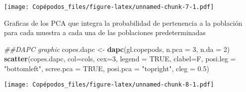 \documentclass[]{article}
\newenvironment{Shaded}{\begin{snugshade}}{\end{snugshade}}
\newcommand{\CommentTok}[1]{\textcolor[rgb]{0.56,0.35,0.01}{\textit{#1}}}
\newcommand{\DataTypeTok}[1]{\textcolor[rgb]{0.13,0.29,0.53}{#1}}
\newcommand{\DecValTok}[1]{\textcolor[rgb]{0.00,0.00,0.81}{#1}}
\newcommand{\FloatTok}[1]{\textcolor[rgb]{0.00,0.00,0.81}{#1}}
\newcommand{\KeywordTok}[1]{\textcolor[rgb]{0.13,0.29,0.53}{\textbf{#1}}}
\newcommand{\NormalTok}[1]{#1}
\newcommand{\OtherTok}[1]{\textcolor[rgb]{0.56,0.35,0.01}{#1}}
\newcommand{\StringTok}[1]{\textcolor[rgb]{0.31,0.60,0.02}{#1}}
\begin{document}
\texttt{[image: Copépodos\_files/figure-latex/unnamed-chunk-7-1.pdf]}

Graficas de los PCA que integra la probabilidad de pertenencia a la
población para cada muestra a cada una de las poblaciones
predeterminadas

\begin{Shaded}
\begin{Highlighting}[]
\CommentTok{##DAPC graphic}
\NormalTok{copes.dapc <-}\StringTok{ }\KeywordTok{dapc}\NormalTok{(gl.copepods, }\DataTypeTok{n.pca =} \DecValTok{3}\NormalTok{, }\DataTypeTok{n.da =} \DecValTok{2}\NormalTok{)}
\KeywordTok{scatter}\NormalTok{(copes.dapc, }\DataTypeTok{col=}\NormalTok{cols, }\DataTypeTok{cex=}\DecValTok{3}\NormalTok{, }\DataTypeTok{legend =} \OtherTok{TRUE}\NormalTok{, }\DataTypeTok{clabel=}\NormalTok{F, }\DataTypeTok{posi.leg =} \StringTok{"bottomleft"}\NormalTok{, }\DataTypeTok{scree.pca =} \OtherTok{TRUE}\NormalTok{, }\DataTypeTok{posi.pca =} \StringTok{"topright"}\NormalTok{, }\DataTypeTok{cleg =} \FloatTok{0.5}\NormalTok{)}
\end{Highlighting}
\end{Shaded}

\texttt{[image: Copépodos\_files/figure-latex/unnamed-chunk-8-1.pdf]}
\end{document}
